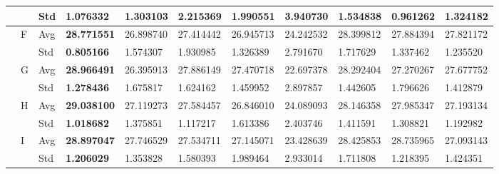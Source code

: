 \documentclass{article} %
\begin{document}
\begin{tabular}{|p{0.4in}|p{0.3in}|p{0.3in}|p{0.5in}|p{0.5in}|p{0.5in}|p{0.5in}|p{0.5in}|p{0.5in}|p{0.5in}|p{0.5in}|}
 &  & Std & 1.076332  & 1.303103  & 2.215369  & 1.990551  & 3.940730  & 1.534838  & \textbf{0.961262 } & 1.324182  \\ \hline 
 & F & Avg & \textbf{28.771551 } & 26.898740  & 27.414442  & 26.945713  & 24.242532  & 28.399812  & 27.884394  & 27.821172  \\ \hline 
 &  & Std & \textbf{0.805166 } & 1.574307  & 1.930985  & 1.326389  & 2.791670  & 1.717629  & 1.337462  & 1.235520  \\ \hline 
 & G & Avg & \textbf{28.966491 } & 26.395913  & 27.886149  & 27.470718  & 22.697378  & 28.292404  & 27.270267  & 27.677752  \\ \hline 
 &  & Std & \textbf{1.278436 } & 1.675817  & 1.624162  & 1.459952  & 2.897857  & 1.442605  & 1.796626  & 1.412879  \\ \hline 
 & H & Avg & \textbf{29.038100 } & 27.119273  & 27.584457  & 26.846010  & 24.089093  & 28.146358  & 27.985347  & 27.193134  \\ \hline 
 &  & Std & \textbf{1.018682 } & 1.375851  & 1.117217  & 1.613386  & 2.403746  & 1.411591  & 1.308821  & 1.192982  \\ \hline 
 & I & Avg & \textbf{28.897047 } & 27.746529  & 27.534711  & 27.145071  & 23.428639  & 28.425853  & 28.735965  & 27.093143  \\ \hline 
 &  & Std & \textbf{1.206029 } & 1.353828  & 1.580393  & 1.989464  & 2.933014  & 1.711808  & 1.218395  & 1.424351  \\ \hline 
\end{tabular}
\end{document}
